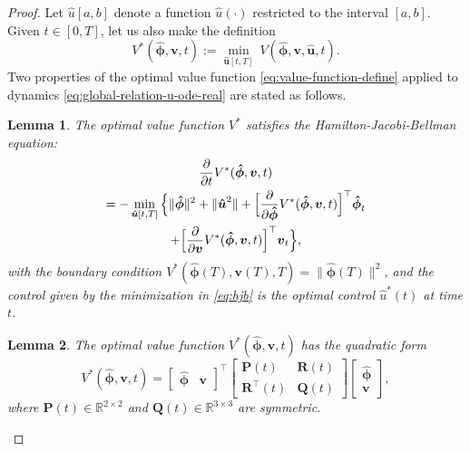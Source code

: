 \documentclass[journal,twoside,web]{ieeecolor}
\newtheorem{lemma}{Lemma}
\newcommand{\RR}{\mathbb{R}}
\newcommand{\state}{\phi}
\newcommand{\statehat}{\hat{\state}}
\begin{document}
\begin{proof}
	Let $\hat{u}[a,b]$ denote a function $\hat{u}(\cdot)$ restricted to the interval $[a,b]$. Given $t\in[0,T]$, let us also make the definition
	\begin{equation}\label{eq:value-function-define}
		V^*(\boldsymbol{\statehat},\boldsymbol{v},t) := \min_{\boldsymbol{\hat{u}}[t,T]}\ V(\boldsymbol{\statehat},\boldsymbol{v},\boldsymbol{\hat{u}},t).
	\end{equation}
 Two properties of the optimal value function \eqref{eq:value-function-define} \cite[Eq.2.2-5, Eq.2.3-7]{anderson2007optimal} applied to dynamics \eqref{eq:global-relation-u-ode-real} are stated as follows. 
\begin{lemma}
	The optimal value function $V^*$ satisfies the Hamilton-Jacobi-Bellman equation:
	\begin{multline}\label{eq:hjb}
		\pdv{}{t}V^*(\boldsymbol{\statehat},\boldsymbol{v},t) \\
		= -\min_{\boldsymbol{\hat{u}}[t,T]}\Big\{\|\boldsymbol{\statehat}\|^2+\|\boldsymbol{\hat{u}}^2\| 
		+ \Big[\pdv{}{\mathbf{\boldsymbol{\statehat}}}V^*(\boldsymbol{\statehat},\boldsymbol{v},t)\Big]^\top \boldsymbol{\statehat}_t \\
		+\Big[\pdv{}{\mathbf{\boldsymbol{v}}}V^*(\boldsymbol{\statehat},\boldsymbol{v},t)\Big]^\top \boldsymbol{v}_t
		\Big\},
	\end{multline}
with the boundary condition $V^*(\boldsymbol{\statehat}(T),\boldsymbol{v}(T),T) = \|\boldsymbol{\statehat}(T)\|^2$, and the control given by the minimization in \eqref{eq:hjb} is the optimal control $\hat{u}^*(t)$ at time $t$.
\end{lemma}
\begin{lemma}\label{lemm:quadratic}
	The optimal value function $V^*(\boldsymbol{\statehat},\boldsymbol{v},t)$ has the quadratic form
	\begin{equation*}
		V^*(\boldsymbol{\statehat},\boldsymbol{v},t)=
		\begin{bmatrix}
			\boldsymbol{\statehat} & \boldsymbol{v}
		\end{bmatrix}^\top
		\begin{bmatrix}
			\mathbf{P}(t) & \mathbf{R}(t) \\ \mathbf{R}^\top(t) & \mathbf{Q}(t)
		\end{bmatrix}
		\begin{bmatrix}
			\boldsymbol{\statehat} \\ \boldsymbol{v}
		\end{bmatrix},
	\end{equation*}
	where $\mathbf{P}(t)\in\RR^{2\times2}$ and $\mathbf{Q}(t)\in\RR^{3\times3}$ are  symmetric.
\end{lemma}


\end{proof}
\end{document}
